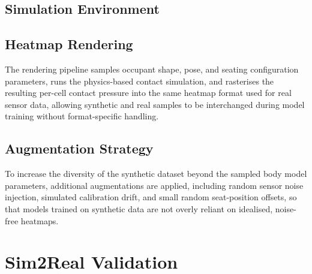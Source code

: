 
\subsection{Simulation Environment}
\label{sec:simulation-environment}



\subsection{Heatmap Rendering }
\label{sec:heatmap-rendering}
The rendering pipeline samples occupant shape, pose, and seating
configuration parameters, runs the physics-based contact simulation, and
rasterises the resulting per-cell contact pressure into the same heatmap
format used for real sensor data, allowing synthetic and real samples to
be interchanged during model training without format-specific handling.


\subsection{Augmentation Strategy}
\label{sec:synthetic-augmentation}
To increase the diversity of the synthetic dataset beyond the sampled
body model parameters, additional augmentations are applied, including
random sensor noise injection, simulated calibration drift, and small
random seat-position offsets, so that models trained on synthetic data
are not overly reliant on idealised, noise-free heatmaps.


\section{Sim2Real Validation}
\label{sec:sim2real-validation}



